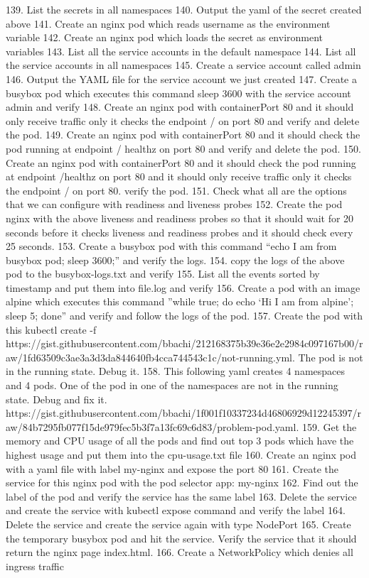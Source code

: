 139. List the secrets in all namespaces
140. Output the yaml of the secret created above
141. Create an nginx pod which reads username as the environment variable
142. Create an nginx pod which loads the secret as environment variables
143. List all the service accounts in the default namespace
144. List all the service accounts in all namespaces
145. Create a service account called admin
146. Output the YAML file for the service account we just created
147. Create a busybox pod which executes this command sleep 3600 with the service account admin and verify
148. Create an nginx pod with containerPort 80 and it should only receive traffic only it checks the endpoint / on port 80 and verify and delete the pod.
149. Create an nginx pod with containerPort 80 and it should check the pod running at endpoint / healthz on port 80 and verify and delete the pod.
150. Create an nginx pod with containerPort 80 and it should check the pod running at endpoint /healthz on port 80 and it should only receive traffic only it checks the endpoint / on port 80. verify the pod.
151. Check what all are the options that we can configure with readiness and liveness probes
152. Create the pod nginx with the above liveness and readiness probes so that it should wait for 20 seconds before it checks liveness and readiness probes and it should check every 25 seconds.
153. Create a busybox pod with this command “echo I am from busybox pod; sleep 3600;” and verify the logs.
154. copy the logs of the above pod to the busybox-logs.txt and verify
155. List all the events sorted by timestamp and put them into file.log and verify
156. Create a pod with an image alpine which executes this command ”while true; do echo ‘Hi I am from alpine’; sleep 5; done” and verify and follow the logs of the pod.
157. Create the pod with this kubectl create -f https://gist.githubusercontent.com/bbachi/212168375b39e36e2e2984c097167b00/raw/1fd63509c3ae3a3d3da844640fb4cca744543c1c/not-running.yml. 
The pod is not in the running state. Debug it.
158. This following yaml creates 4 namespaces and 4 pods. One of the pod in one of the namespaces are not in the running state. Debug and fix it. 
https://gist.githubusercontent.com/bbachi/1f001f10337234d46806929d12245397/raw/84b7295fb077f15de979fec5b3f7a13fc69c6d83/problem-pod.yaml.
159. Get the memory and CPU usage of all the pods and find out top 3 pods which have the highest usage and put them into the cpu-usage.txt file
160. Create an nginx pod with a yaml file with label my-nginx and expose the port 80
161. Create the service for this nginx pod with the pod selector app: my-nginx
162. Find out the label of the pod and verify the service has the same label
163. Delete the service and create the service with kubectl expose command and verify the label
164. Delete the service and create the service again with type NodePort
165. Create the temporary busybox pod and hit the service. Verify the service that it should return the nginx page index.html.
166. Create a NetworkPolicy which denies all ingress traffic